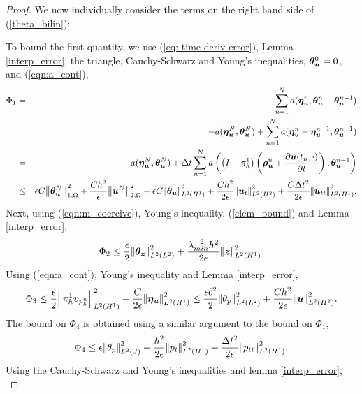 \begin{proof}
We now individually consider the terms on the right hand side of (\ref{theta_bilin}):

To bound the first quantity, we use (\ref{eq: time deriv error}), Lemma \ref{interp_error}, the triangle, Cauchy-Schwarz and Young's inequalities, $\boldsymbol{\theta}_{\boldsymbol{u}}^{0}=0$, and (\ref{eqn:a_cont}),
\begin{eqnarray}
\label{eqn:rhs_1}
\Phi_{1}&=& - \sum^{N}_{n=1} a({\intdispn},\auxdispn-\auxdispnm) \nonumber \\
 &=&-a(\intdisp^{N},\auxdisp^{N}) + \sum^{N}_{n=1} a({\intdispn-\intdispnm},\auxdispnm) \nonumber \\
 &=&-a(\intdisp^{N},\auxdisp^{N}) +\Delta t\sum^{N}_{n=1} a\left(  \left(I-\projlinear\right)
       \left(\disptimerrn + \frac{ \partial \dispcontn }{\partial t}\right) ,\auxdispnm\right) \nonumber \\
 &\leq& {\epsilon C}\honenorm{\auxdisp^{N}}^{2} + \frac{C h^2}{\epsilon}\htwonorm{\dispcont^{N}}^{2} + {\epsilon C } \honetimenorm{\auxdisp}^{2}+ \frac{ C h^2}{2\epsilon} \htwotimenorm{\dispcont_t}^{2} + \frac{C \Delta t^{2}}{2\epsilon}  \honetimenorm{\dispcont_{tt}}^{2}. \nonumber \\
\end{eqnarray}
Next, using (\ref{eqn:m_coercive}), Young's inequality,  (\ref{clem_bound}) and Lemma \ref{interp_error},
\begin{equation*}
\label{eqn:rhs_2}
\Phi_{2} \leq \frac{\epsilon}{ 2 } \ltwotimenorm{\auxflux}^{2} +  \frac{\lambda_{min}^{-2} h^2}{ 2 \epsilon } \honetimenorm{\fluxcont}^{2}.
\end{equation*}
Using (\ref{eqn:a_cont}), Young's inequality and  Lemma \ref{interp_error},
\begin{equation*}
\label{eqn:rhs_3}
\Phi_{3}\leq \frac{ \epsilon}{ 2 } \honetimenorm{\projscott \vphn}^{2} +  \frac{  C}{ 2 \epsilon}\honetimenorm{\intdisp}^{2}
\leq \frac{ \epsilon \hat{c}^{2}}{ 2 } \ltwotimenorm{\auxp}^{2} +  \frac{C h^2}{ 2 \epsilon }\htwotimenorm{\dispcont}^{2}.
\end{equation*}
The bound on $\Phi_4$ is obtained using a similar argument to the bound on $\Phi_1$,
\begin{equation*}
\label{eqn:rhs_4}
\Phi_{4} \leq {\epsilon }  \jtimenorm{\auxp}^{2}+ \frac{h^2 }{2\epsilon}  \honetimenorm{p_t}^{2} + \frac{\Delta t^{2}}{2\epsilon}  \honetimenorm{p_{tt}}^{2}.
\end{equation*}
Using the Cauchy-Schwarz and Young's inequalities and lemma \ref{interp_error},
\begin{equation*}

\end{equation*}
\end{proof}
